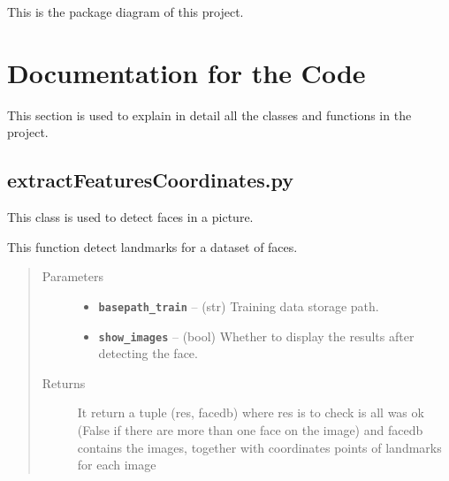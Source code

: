 \documentclass[letterpaper,10pt,english]{sphinxmanual}
\begin{document}
This is the package diagram of this project.

\noindent{}


\chapter{Documentation for the Code}
\label{Documentation of Code::doc}\label{Documentation of Code:documentation-for-the-code}
This section is used to explain in detail all the classes and functions in the project.


\section{extractFeaturesCoordinates.py}
\label{Documentation of Code:extractfeaturescoordinates-py}\label{Documentation of Code:module-extractFeaturesCoordinates}
This class is used to detect faces in a picture.

\begin{fulllineitems}
\label{Documentation of Code:extractFeaturesCoordinates.extractFeatures}
This function detect landmarks for a dataset of faces.
\begin{quote}\begin{description}
\item[{Parameters}] \leavevmode\begin{itemize}
\item {} 
\textbf{\texttt{basepath\_train}} -- (str) Training data storage path.

\item {} 
\textbf{\texttt{show\_images}} -- (bool) Whether to display the results after detecting the face.

\end{itemize}

\item[{Returns}] \leavevmode
It return a tuple (res, facedb) where res is to check is all was ok (False if there are more than one face on the image) and facedb contains the images, together with coordinates points of landmarks for each image

\end{description}\end{quote}

\end{fulllineitems}
\end{document}
